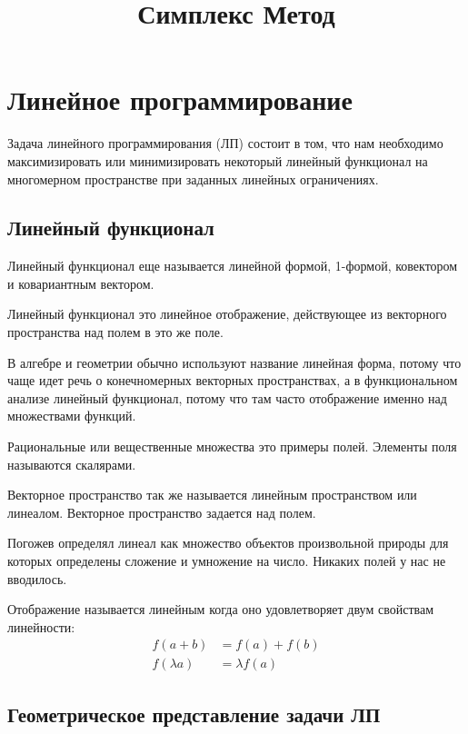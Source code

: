 \documentclass[a4paper,article,14pt]{extarticle}
\title{Симплекс Метод}
\begin{document}
\maketitle
\newpage
\tableofcontents
\newpage

\section{Линейное программирование}

Задача линейного программирования (ЛП) состоит в том, что нам необходимо максимизировать или минимизировать некоторый линейный функционал на многомерном пространстве при заданных линейных ограничениях.

\subsection{Линейный функционал}

Линейный функционал еще называется линейной формой, 1-формой, ковектором и ковариантным вектором.

Линейный функционал это линейное отображение, действующее из векторного пространства над полем в это же поле.

В алгебре и геометрии обычно используют название линейная форма, потому что чаще идет речь о конечномерных векторных пространствах, а в функциональном анализе линейный функционал, потому что там часто отображение именно над множествами функций.

Рациональные или вещественные множества это примеры полей.
Элементы поля называются скалярами.

Векторное пространство так же называется линейным пространством или линеалом.
Векторное пространство задается над полем.

Погожев определял линеал как множество объектов произвольной природы для которых определены сложение и умножение на число.
Никаких полей у нас не вводилось.

Отображение называется линейным когда оно удовлетворяет двум свойствам линейности:
\begin{align}
    f(a + b) & = f(a) + f(b) \\
    f(\lambda a) & = \lambda f(a)
\end{align}

\subsection{Геометрическое представление задачи ЛП}
\end{document}
